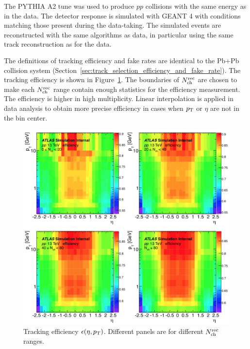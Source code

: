 The PYTHIA A2 tune was used to produce $pp$ collisions with the same energy as in the data. The detector response is simulated with GEANT 4 with conditions matching those present during the data-taking. The simulated events are reconstructed with the same algorithms as data, in particular using the same track reconstruction as for the data.

The definitions of tracking efficiency and fake rates are identical to the Pb+Pb collision system (Section~\ref{sec:track_selection_efficiency_and_fake_rate}). The tracking efficiency is shown in Figure~\ref{fig:detector_ATLAS_track_eff_pp13}. The boundaries of $N_\text{ch}^\text{rec}$ are chosen to make each $N_\text{ch}^\text{rec}$ range contain enough statistics for the efficiency measurement. The efficiency is higher in high multiplicity. Linear interpolation is applied in data analysis to obtain more precise efficiency in cases when $p_\text{T}$ or $\eta$ are not in the bin center.
\begin{figure}[H]
\centering
\includegraphics[width=.95\linewidth]{figs/chapter_detector/ATLAS_track_eff_pp13.png}
\caption{Tracking efficiency $\epsilon(\eta, p_\text{T})$. Different panels are for different $N_\text{ch}^\text{rec}$ ranges.}
\label{fig:detector_ATLAS_track_eff_pp13}
\end{figure}


